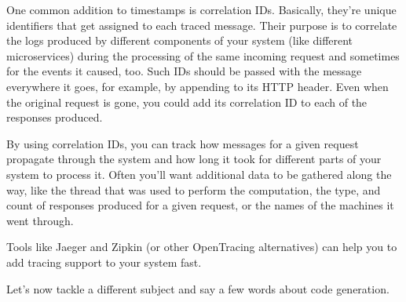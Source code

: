 One common addition to timestamps is correlation IDs. Basically, they're unique identifiers that get assigned to each traced message. Their purpose is to correlate the logs produced by different components of your system (like different microservices) during the processing of the same incoming request and sometimes for the events it caused, too. Such IDs should be passed with the message everywhere it goes, for example, by appending to its HTTP header. Even when the original request is gone, you could add its correlation ID to each of the responses produced.

By using correlation IDs, you can track how messages for a given request propagate through the system and how long it took for different parts of your system to process it. Often you'll want additional data to be gathered along the way, like the thread that was used to perform the computation, the type, and count of responses produced for a given request, or the names of the machines it went through.

Tools like Jaeger and Zipkin (or other OpenTracing alternatives) can help you to add tracing support to your system fast.

Let's now tackle a different subject and say a few words about code generation.





